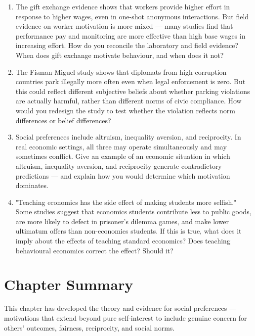 \documentclass[12pt, letterpaper]{article}
\begin{document}
\begin{enumerate}
\item The gift exchange evidence shows that workers provide higher effort in response to higher wages, even in one-shot anonymous interactions. But field evidence on worker motivation is more mixed --- many studies find that performance pay and monitoring are more effective than high base wages in increasing effort. How do you reconcile the laboratory and field evidence? When does gift exchange motivate behaviour, and when does it not?

\item The Fisman-Miguel study shows that diplomats from high-corruption countries park illegally more often even when legal enforcement is zero. But this could reflect different subjective beliefs about whether parking violations are actually harmful, rather than different norms of civic compliance. How would you redesign the study to test whether the violation reflects norm differences or belief differences?

\item Social preferences include altruism, inequality aversion, and reciprocity. In real economic settings, all three may operate simultaneously and may sometimes conflict. Give an example of an economic situation in which altruism, inequality aversion, and reciprocity generate contradictory predictions --- and explain how you would determine which motivation dominates.

\item "Teaching economics has the side effect of making students more selfish." Some studies suggest that economics students contribute less to public goods, are more likely to defect in prisoner's dilemma games, and make lower ultimatum offers than non-economics students. If this is true, what does it imply about the effects of teaching standard economics? Does teaching behavioural economics correct the effect? Should it?
\end{enumerate}

\newpage


\section*{Chapter Summary}


This chapter has developed the theory and evidence for social preferences --- motivations that extend beyond pure self-interest to include genuine concern for others' outcomes, fairness, reciprocity, and social norms.
\end{document}
